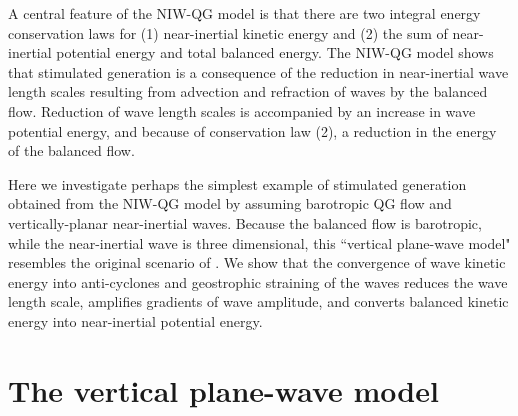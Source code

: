 \documentclass{jfm}
\newcommand{\NIW}{near-inertial wave}
\begin{document}
A central feature of the NIW-QG  model is that there are two integral energy conservation laws for  (1) near-inertial kinetic energy and (2) the sum of near-inertial potential energy and total balanced energy.
The NIW-QG model shows that stimulated generation is a consequence of the reduction in \NIW{} length scales
resulting from  advection and refraction of  waves by the balanced flow.  Reduction of wave length scales is accompanied by an increase in wave potential energy, and  because of conservation law (2), a reduction in the energy of the balanced flow.

Here we investigate perhaps the simplest example of stimulated generation obtained from  the NIW-QG model by assuming  barotropic QG flow and vertically-planar \NIW s.
Because
the balanced flow is barotropic, while the \NIW{} is three dimensional,
this ``vertical plane-wave model" resembles the original scenario of
\cite{gertz_straub2009}. We show that the convergence of wave kinetic energy
into anti-cyclones and  geostrophic straining of the  waves reduces the wave length
scale, amplifies  gradients of wave amplitude, and converts balanced kinetic
energy into near-inertial potential energy.

\section{The vertical plane-wave model}\label{TheModel}
\end{document}
